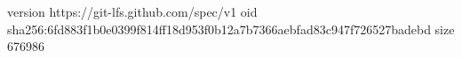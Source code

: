 version https://git-lfs.github.com/spec/v1
oid sha256:6fd883f1b0e0399f814ff18d953f0b12a7b7366aebfad83c947f726527badebd
size 676986
